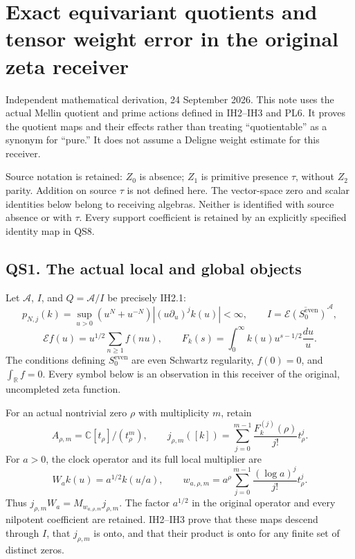 \section{Exact equivariant quotients and tensor weight error in the
original zeta
receiver}\label{exact-equivariant-quotients-and-tensor-weight-error-in-the-original-zeta-receiver}

Independent mathematical derivation, 24 September 2026. This note uses
the actual Mellin quotient and prime actions defined in IH2--IH3 and
PL6. It proves the quotient maps and their effects rather than treating
``quotientable'' as a synonym for ``pure.'' It does not assume a Deligne
weight estimate for this receiver.

Source notation is retained: \(Z_0\) is absence; \(Z_1\) is primitive
presence \(\tau\), without \(Z_2\) parity. Addition on source \(\tau\)
is not defined here. The vector-space zero and scalar identities below
belong to receiving algebras. Neither is identified with source absence
or with \(\tau\). Every support coefficient is retained by an explicitly
specified identity map in QS8.

\subsection{QS1. The actual local and global
objects}\label{qs1.-the-actual-local-and-global-objects}

Let \(\mathcal A\), \(I\), and \(Q=\mathcal A/I\) be precisely IH2.1: \[
p_{N,j}(k)=\sup_{u>0}(u^N+u^{-N})|(u\partial_u)^jk(u)|<\infty,\qquad
I=\overline{\mathcal E(S_0^{\mathrm{even}})}^{\mathcal A},
\] \[
\mathcal E f(u)=u^{1/2}\sum_{n\ge1}f(nu),\qquad
F_k(s)=\int_0^\infty k(u)u^{s-1/2}\frac{du}{u}.
\tag{QS1.1}
\] The conditions defining \(S_0^{\mathrm{even}}\) are even Schwartz
regularity, \(f(0)=0\), and \(\int_{\mathbb R}f=0\). Every symbol below
is an observation in this receiver of the original, uncompleted zeta
function.

For an actual nontrivial zero \(\rho\) with multiplicity \(m\), retain
\[
A_{\rho,m}=\mathbb C[t_\rho]/(t_\rho^m),\qquad
j_{\rho,m}([k])=\sum_{j=0}^{m-1}\frac{F_k^{(j)}(\rho)}{j!}t_\rho^j.
\tag{QS1.2}
\] For \(a>0\), the clock operator and its full local multiplier are \[
W_a k(u)=a^{1/2}k(u/a),\qquad
w_{a,\rho,m}=a^\rho\sum_{j=0}^{m-1}\frac{(\log a)^j}{j!}t_\rho^j.
\tag{QS1.3}
\] Thus \(j_{\rho,m}W_a=M_{w_{a,\rho,m}}j_{\rho,m}\). The factor
\(a^{1/2}\) in the original operator and every nilpotent coefficient are
retained. IH2--IH3 prove that these maps descend through \(I\), that
\(j_{\rho,m}\) is onto, and that their product is onto for any finite
set of distinct zeros.

